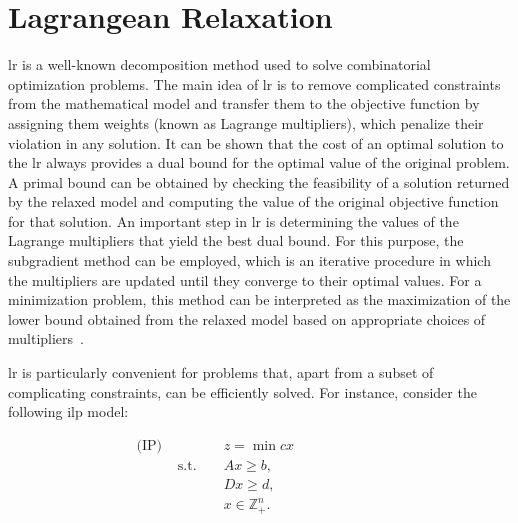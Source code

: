 
\section{Lagrangean Relaxation}\label{sec:cbrp-lagrangean-relaxation}

\gls{lr} is a well-known decomposition method used to solve combinatorial
optimization problems. The main idea of \gls{lr} is to remove complicated
constraints from the mathematical model and transfer them to the objective
function by assigning them weights (known as Lagrange multipliers), which
penalize their violation in any solution. It can be shown that the cost of an
optimal solution to the \gls{lr} always provides a dual bound for the optimal
value of the original problem. A primal bound can be obtained by checking the
feasibility of a solution returned by the relaxed model and computing the value
of the original objective function for that solution. An important step in
\gls{lr} is determining the values of the Lagrange multipliers that yield the
best dual bound. For this purpose, the subgradient method can be employed, which
is an iterative procedure in which the multipliers are updated until they
converge to their optimal values. For a minimization problem, this method can be
interpreted as the maximization of the lower bound obtained from the relaxed
model based on appropriate choices of multipliers~\cite{Beasley:1993}.

\gls{lr} is particularly convenient for problems that, apart from a subset of
complicating constraints, can be efficiently solved. For instance, consider the
following \gls{ilp} model:

\begin{align*}
	\text{(IP) } &              &  & z = \min cx           &  &  &  &  &  &  &  & \\
	             & \text{s.t. } &  & Ax \geq b,            &  &  &  &  &  &  &  & \\
	             &              &  & Dx \geq d,            &  &  &  &  &  &  &  & \\
	             &              &  & x \in \mathbb{Z}^n_+. &  &  &  &  &  &  &  &
\end{align*}

